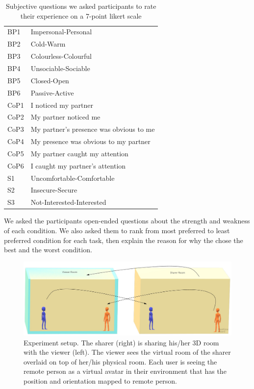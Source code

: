 \begin{table}
    \centering
    \begin{tabular}{ll}
BP1 &    Impersonal-Personal\\
BP2 &    Cold-Warm\\
BP3 &    Colourless-Colourful\\
BP4 &    Unsociable-Sociable\\
BP5 &    Closed-Open\\
BP6 &    Passive-Active\\
CoP1    &   I noticed my partner\\
CoP2    &   My partner noticed me\\
CoP3    &   My partner's presence was obvious to me\\
CoP4    &   My presence was obvious to my partner\\
CoP5    &   My partner caught my attention \\
CoP6    &   I caught my partner's attention\\
S1  & Uncomfortable-Comfortable\\
S2  & Insecure-Secure\\
S3  & Not-Interested-Interested\\
    \end{tabular}
    \caption{Subjective questions we asked participants to rate their experience on a 7-point likert scale}
    \label{tab:frontier18:questions}
\end{table}

We asked the participants open-ended questions about the strength and weakness of each condition. We also asked them to rank from most preferred to least preferred condition for each task, then explain the reason for why the chose the best and the worst condition. 

\begin{figure}
\begin{center}
\includegraphics[width=\linewidth]{images/frontier18/experiment-setup.jpg}
\caption{Experiment setup. The sharer (right) is sharing his/her 3D room with the viewer (left). The viewer sees the virtual room of the sharer overlaid on top of her/his physical room. Each user is seeing the remote person as a virtual avatar in their environment that has the position and orientation mapped to remote person.}\label{fig:frontier18:setup}
\end{center}
\end{figure}

